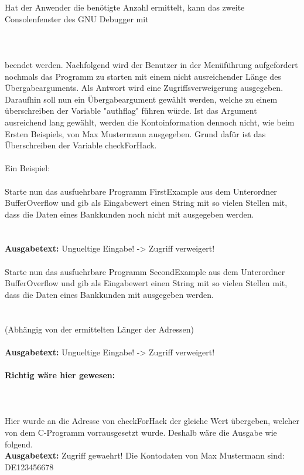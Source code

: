 Hat der Anwender die benötigte Anzahl ermittelt, kann das zweite Consolenfenster des GNU Debugger mit\\\\ \\\\beendet werden. Nachfolgend wird der Benutzer in der Menüführung aufgefordert nochmals das Programm zu starten mit einem nicht ausreichender Länge des Übergabearguments. Als Antwort wird eine Zugriffsverweigerung ausgegeben. Daraufhin soll nun ein Übergabeargument gewählt werden, welche zu einem überschreiben der Variable "authflag" führen würde. Ist das Argument ausreichend lang gewählt, werden die Kontoinformation dennoch nicht, wie beim Ersten Beispiels, von Max Mustermann ausgegeben. Grund dafür ist das Überschreiben der Variable checkForHack.\\\\Ein Beispiel:\\\\Starte nun das ausfuehrbare Programm FirstExample aus dem Unterordner BufferOverflow und gib als Eingabewert einen String mit so vielen Stellen mit, dass die Daten eines Bankkunden noch nicht mit ausgegeben werden.\\\\
\\
\textbf{Ausgabetext:} Ungueltige Eingabe! -> Zugriff verweigert!
\\\\
Starte nun das ausfuehrbare Programm SecondExample aus dem Unterordner BufferOverflow und gib als Eingabewert einen String mit so vielen Stellen mit, dass die Daten eines Bankkunden mit ausgegeben werden.\\\\
\\
(Abhängig von der ermittelten Länger der Adressen)\\\\
\textbf{Ausgabetext:} Ungueltige Eingabe! -> Zugriff verweigert!
\\\\
\textbf{Richtig wäre hier gewesen:}\\\\
\\\\
Hier wurde an die Adresse von checkForHack der gleiche Wert übergeben, welcher von dem C-Programm vorrausgesetzt wurde. Deshalb wäre die Ausgabe wie folgend.\\
\textbf{Ausgabetext:} Zugriff gewaehrt! Die Kontodaten von Max Mustermann sind: DE123456678

